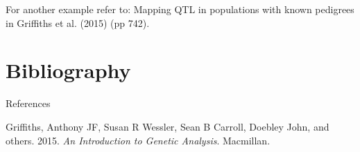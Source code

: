 \documentclass[11pt,dvipsnames,ignorenonframetext,aspectratio=169]{beamer}
\begin{document}
\begin{frame}{}
\protect\hypertarget{section-15}{}

For another example refer to: Mapping QTL in populations with known
pedigrees in Griffiths et al. (2015) (pp 742).

\end{frame}

\hypertarget{bibliography}{%
\section{Bibliography}\label{bibliography}}

\begin{frame}{References}
\protect\hypertarget{references}{}

\hypertarget{refs}{}
\leavevmode\hypertarget{ref-griffiths2015introduction}{}%
Griffiths, Anthony JF, Susan R Wessler, Sean B Carroll, Doebley John,
and others. 2015. \emph{An Introduction to Genetic Analysis}. Macmillan.

\end{frame}
\end{document}
